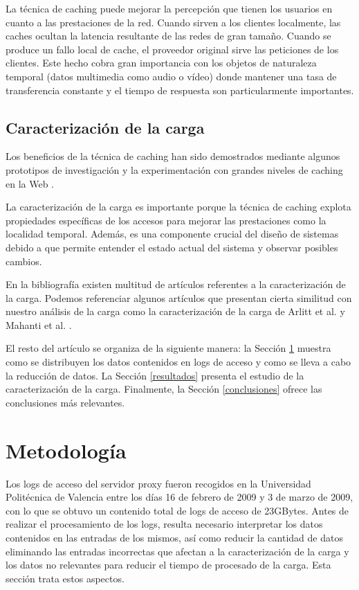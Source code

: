 \documentclass[twocolumn]{Jornadas}
\begin{document}
La técnica de caching puede mejorar la percepción que tienen los usuarios en cuanto a las prestaciones de la red. Cuando sirven a los clientes localmente, las caches ocultan la latencia resultante de las redes de gran tamaño. Cuando se produce un fallo local de cache, el proveedor original sirve las peticiones de los clientes.
Este hecho cobra gran importancia con los objetos de naturaleza temporal (datos multimedia como audio o vídeo) donde mantener una tasa de transferencia constante y el tiempo de respuesta son particularmente importantes.

\subsection{Caracterización de la carga}
Los beneficios de la técnica de caching han sido demostrados mediante algunos prototipos de investigación y la experimentación con grandes niveles de caching en la Web \cite{squid}. 

La caracterización de la carga es importante porque la técnica de caching explota propiedades específicas de los accesos para mejorar las prestaciones como la localidad temporal. Además, es una componente crucial del diseño de sistemas debido a que permite entender el estado actual del sistema y observar posibles cambios.

En la bibliografía existen multitud de artículos referentes a la caracterización de la carga. Podemos referenciar algunos artículos que presentan cierta similitud con nuestro análisis de la carga como la caracterización de la carga de Arlitt et al. \cite{arlitt2} y Mahanti et al. \cite{mahanti}.

El resto del artículo se organiza de la siguiente manera: la Sección \ref{meto} muestra como se distribuyen los datos contenidos en logs de acceso y como se lleva a cabo la reducción de datos. La Sección \ref{resultados} presenta el estudio de la caracterización de la carga. Finalmente, la Sección \ref{conclusiones} ofrece las conclusiones más relevantes.

\section{Metodología}
\label{meto}

Los logs de acceso del servidor proxy fueron recogidos en la Universidad Politécnica de Valencia entre los días 16 de febrero de 2009 y 3 de marzo de 2009, con lo que se obtuvo un contenido total de logs de acceso de 23GBytes. Antes de realizar el procesamiento de los logs, resulta necesario interpretar los datos contenidos en las entradas de los mismos, así como reducir la cantidad de datos eliminando las entradas incorrectas que afectan a la caracterización de la carga y los datos no relevantes para reducir el tiempo de procesado de la carga. Esta sección trata estos aspectos.
\end{document}
